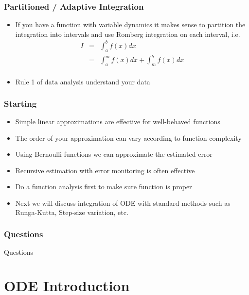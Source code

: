 \documentclass[10pt]{beamer}
\begin{document}
\begin{frame}
  \frametitle{Partitioned / Adaptive Integration}
  \begin{itemize}
  \item If you have a function with variable dynamics it makes sense
    to partition the integration into intervals and use Romberg
    integration on each interval, i.e.
    \[
      \begin{array}{rcl}
        I & = & \int_a^b f(x) dx \\
          & = & \int_a^m f(x) dx + \int_m^b f(x) dx\\
      \end{array}
    \]
  \item Rule 1 of data analysis understand your data 
  \end{itemize}
\end{frame}

\begin{frame}
  \frametitle{Starting}
  \begin{itemize}
  \item Simple linear approximations are effective for well-behaved functions
  \item The order of your approximation can vary according to function complexity
  \item Using Bernoulli functions we can approximate the estimated error
  \item Recursive estimation with error monitoring is often effective
  \item Do a function analysis first to make sure function is proper
  \item Next we will discuss integration of ODE with standard
    methods such as Runga-Kutta, Step-size variation, etc.
  \end{itemize}
\end{frame}

\begin{frame}
  \frametitle{Questions}
  \centerline{\Huge Questions}
\end{frame}


\section{ODE Introduction}
\end{document}
